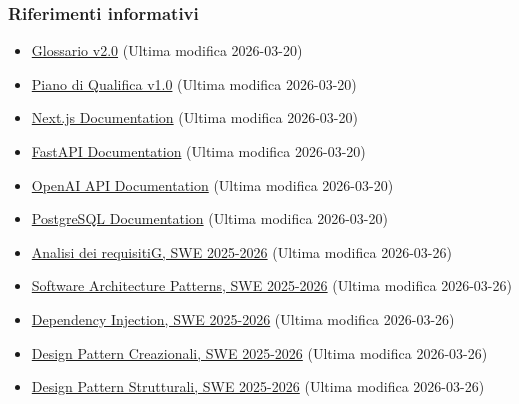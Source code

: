 \documentclass[a4paper, 11pt, oneside]{scrartcl}
\begin{document}
\subsubsection{Riferimenti informativi}
\begin{itemize}
    \item \href{https://swenightpro.github.io/Documentazione/docs/RTB/Documentazione%20Esterna/Glossario_v2.0.pdf}{Glossario v2.0} (Ultima modifica 2026-03-20)
    \item \href{https://swenightpro.github.io/Documentazione/docs/RTB/Documentazione%20Esterna/Piano_di_Qualifica_v1.0.pdf}{Piano di Qualifica v1.0} (Ultima modifica 2026-03-20)
    \item \href{https://nextjs.org/docs}{Next.js Documentation} (Ultima modifica 2026-03-20)
    \item \href{https://fastapi.tiangolo.com/}{FastAPI Documentation} (Ultima modifica 2026-03-20)
    \item \href{https://platform.openai.com/docs}{OpenAI API Documentation} (Ultima modifica 2026-03-20)
    \item \href{https://www.postgresql.org/docs/}{PostgreSQL Documentation} (Ultima modifica 2026-03-20)
    \item \href{https://www.math.unipd.it/~tullio/IS-1/2025/Dispense/T05.pdf}{Analisi dei requisitiG, SWE 2025-2026} (Ultima modifica 2026-03-26)
    \item \href{https://www.math.unipd.it/~rcardin/swea/2022/Software%20Architecture%20Patterns.pdf}{Software Architecture Patterns, SWE 2025-2026} (Ultima modifica 2026-03-26)
    \item \href{https://www.math.unipd.it/~rcardin/swea/2022/Design%20Pattern%20Architetturali%20-%20Dependency%20Injection.pdf}{Dependency Injection, SWE 2025-2026} (Ultima modifica 2026-03-26)
    \item \href{https://www.math.unipd.it/~rcardin/swea/2022/Design%20Pattern%20Creazionali.pdf}{Design Pattern Creazionali, SWE 2025-2026} (Ultima modifica 2026-03-26)
    \item \href{https://www.math.unipd.it/~rcardin/swea/2022/Design%20Pattern%20Strutturali.pdf}{Design Pattern Strutturali, SWE 2025-2026} (Ultima modifica 2026-03-26)

\end{itemize}

\newpage
\end{document}
